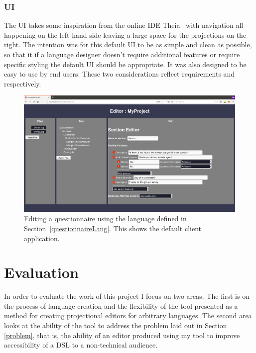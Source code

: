\documentclass{article}
\begin{document}
\subsubsection{UI}
The UI takes some inspiration from the online IDE Theia~\cite{theia} with navigation all happening on the left hand side leaving a large space for the projections on the right. The intention was for this default UI to be as simple and clean as possible, so that it if a language designer doesn't require additional features or require specific styling the default UI should be appropriate. It was also designed to be easy to use by end users. These two considerations reflect requirements \RSetup and \RIntuitive respectively.
\begin{figure}[h!]
  \centering
  \includegraphics[width=\linewidth]{./Screenshots/questionnaireUI2.png}
  \caption{Editing a questionnaire using the language defined in Section~\ref{questionnaireLang}. This shows the default client application.}
  \label{fig:webUI}
\end{figure}
%
%
\section{Evaluation}\label{evaluation}
In order to evaluate the work of this project I focus on two areas. The first is on the process of language creation and the flexibility of the tool presented as a method for creating projectional editors for arbitrary languages. The second area looks at the ability of the tool to address the problem laid out in Section \ref{problem}, that is, the ability of an editor produced using my tool to improve accessibility of a DSL to a non-technical audience.
\end{document}

